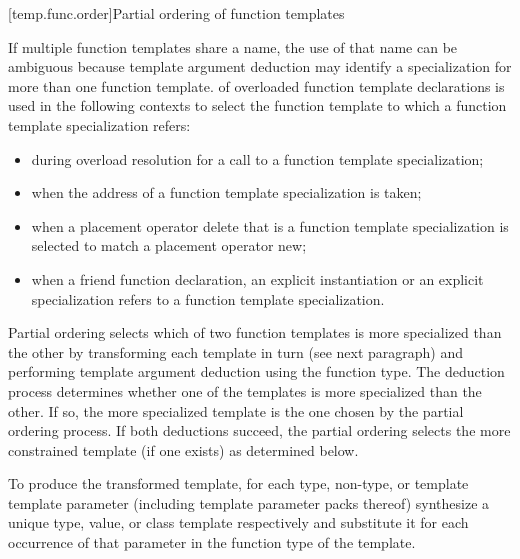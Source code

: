 \documentclass{wg21}
\begin{document}
[temp.func.order]{Partial ordering of function templates}

\pnum
{}%
%
If multiple function templates share a name,
the use of that name can be ambiguous because
template argument deduction may identify
a specialization for more than one function template.
of overloaded function template declarations is used in the following contexts
to select the function template to which a function template specialization
refers:
\begin{itemize}
    \item
    during overload resolution for a call to a function template specialization;
    \item
    when the address of a function template specialization is taken;
    \item
    when a placement operator delete that is a
    function template
    specialization
    is selected to match a placement operator new;
    \item
    when a friend function declaration, an
    explicit instantiation or an explicit specialization refers to
    a function template specialization.
\end{itemize}

\pnum
Partial ordering selects which of two function templates is more
specialized than the other by transforming each template in turn
(see next paragraph) and performing template argument deduction
using the function type.
The deduction process determines whether
one of the templates is more specialized than the other. If so, the
more specialized template is the one chosen by the partial ordering
process.
If both deductions succeed, the partial ordering selects
the more constrained template (if one exists) as determined below.

\pnum
To produce the transformed template, for each type, non-type, or template
template parameter (including template parameter packs
thereof) synthesize a unique type, value, or class template
respectively and substitute it for each occurrence of that parameter
in the function type of the template.


\end{document}
